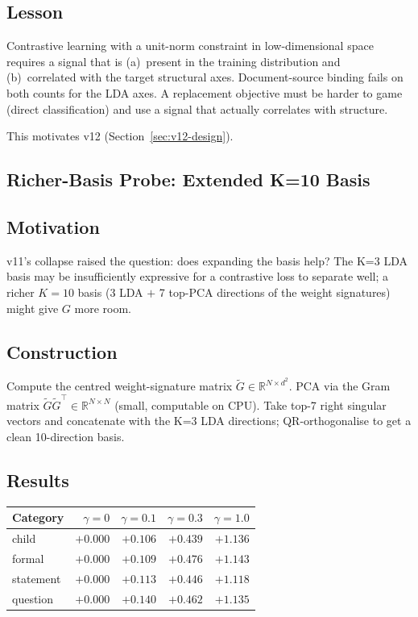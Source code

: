 \documentclass[11pt, a4paper]{article}
\theoremstyle{plain}
\theoremstyle{definition}
\theoremstyle{remark}
\begin{document}
\subsection{Lesson}

Contrastive learning with a unit-norm constraint in low-dimensional space requires
a signal that is (a)~present in the training distribution and (b)~correlated with the
target structural axes.
Document-source binding fails on both counts for the LDA axes.
A replacement objective must be harder to game (direct classification) and use a
signal that actually correlates with structure.

This motivates v12 (Section~\ref{sec:v12-design}).


\subsection{Richer-Basis Probe: Extended K=10 Basis}
\label{sec:richer-basis}

\subsection{Motivation}

v11's collapse raised the question: does expanding the basis help?
The K=3 LDA basis may be insufficiently expressive for a contrastive loss to
separate well; a richer $K=10$ basis (3 LDA $+$ 7 top-PCA directions of
the weight signatures) might give $G$ more room.

\subsection{Construction}

Compute the centred weight-signature matrix $\tilde{G} \in \mathbb{R}^{N \times d^2}$.
PCA via the Gram matrix $\tilde{G}\tilde{G}^\top \in \mathbb{R}^{N \times N}$
(small, computable on CPU).
Take top-7 right singular vectors and concatenate with the K=3 LDA directions;
QR-orthogonalise to get a clean 10-direction basis.

\subsection{Results}

\begin{center}\small
\begin{tabular}{lrrrr}
\toprule
Category & $\gamma=0$ & $\gamma=0.1$ & $\gamma=0.3$ & $\gamma=1.0$ \\
\midrule
child     & $+0.000$ & $+0.106$ & $+0.439$ & $+1.136$ \\
formal    & $+0.000$ & $+0.109$ & $+0.476$ & $+1.143$ \\
statement & $+0.000$ & $+0.113$ & $+0.446$ & $+1.118$ \\
question  & $+0.000$ & $+0.140$ & $+0.462$ & $+1.135$ \\
\bottomrule
\end{tabular}
\end{center}
\end{document}
